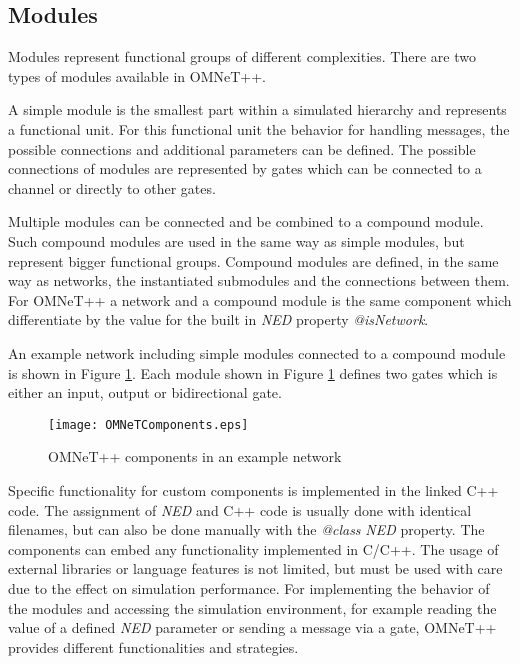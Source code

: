 \subsection{Modules}
\label{sec:omnet_components_modules}
Modules represent functional groups of different complexities.
There are two types of modules available in OMNeT++.

A simple module is the smallest part within a simulated hierarchy and represents a functional unit.
For this functional unit the behavior for handling messages, the possible connections and additional parameters can be defined. \cite[section 3.3]{omnet_manual}
The possible connections of modules are represented by gates which can be connected to a channel or directly to other gates.

Multiple modules can be connected and be combined to a compound module.
Such compound modules are used in the same way as simple modules, but represent bigger functional groups.
Compound modules are defined, in the same way as networks, the instantiated submodules and the connections between them. \cite[section 3.4]{omnet_manual}
For OMNeT++ a network and a compound module is the same component which differentiate by the value for the built in \emph{NED} property \emph{@isNetwork}.

An example network including simple modules connected to a compound module is shown in Figure \ref{fig:OMNeTComponents}.
Each module shown in Figure \ref{fig:OMNeTComponents} defines two gates which is either an input, output or bidirectional gate.

\begin{figure}
    \centering
    \texttt{[image: OMNeTComponents.eps]}
    \caption{OMNeT++ components in an example network}
    \label{fig:OMNeTComponents}
\end{figure}

Specific functionality for custom components is implemented in the linked C++ code.
The assignment of \emph{NED} and C++ code is usually done with identical filenames, but can also be done manually with the \emph{@class} \emph{NED} property.
The components can embed any functionality implemented in C/C++.
The usage of external libraries or language features is not limited, but must be used with care due to the effect on simulation performance.
For implementing the behavior of the modules and accessing the simulation environment, for example reading the value of a defined \emph{NED} parameter or sending a message via a gate, 
OMNeT++ provides different functionalities and strategies.

